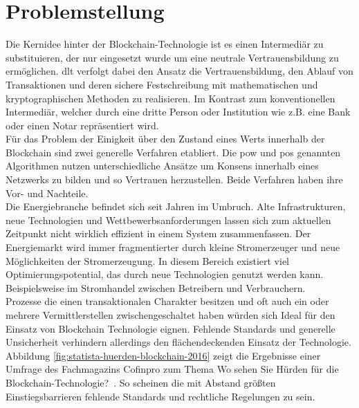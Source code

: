 \section{Problemstellung}

Die Kernidee hinter der Blockchain-Technologie ist es einen Intermediär zu substituieren, der nur eingesetzt wurde um eine neutrale Vertrauensbildung zu ermöglichen. \ac{dlt} verfolgt dabei den Ansatz die Vertrauensbildung, den Ablauf von Transaktionen und deren sichere Festschreibung mit mathematischen und kryptographischen Methoden zu realisieren. Im Kontrast zum konventionellen Intermediär, welcher durch eine dritte Person oder Institution wie z.B. eine Bank oder einen Notar repräsentiert wird.\\

Für das Problem der Einigkeit über den Zustand eines Werts innerhalb der Blockchain sind zwei generelle Verfahren etabliert. Die \ac{pow} und \ac{pos} genannten Algorithmen nutzen unterschiedliche Ansätze um Konsens innerhalb eines Netzwerks zu bilden und so Vertrauen herzustellen. Beide Verfahren haben ihre Vor- und Nachteile.\\

Die Energiebranche befindet sich seit Jahren im Umbruch. Alte Infrastrukturen, neue Technologien und Wettbewerbsanforderungen lassen sich zum aktuellen Zeitpunkt nicht wirklich effizient in einem System zusammenfassen. Der Energiemarkt wird immer fragmentierter durch kleine Stromerzeuger und neue Möglichkeiten der Stromerzeugung. In diesem Bereich existiert viel Optimierungspotential, das durch neue Technologien genutzt werden kann. Beispielsweise im Stromhandel zwischen Betreibern und Verbrauchern.\\

Prozesse die einen transaktionalen Charakter besitzen und oft auch ein oder mehrere Vermittlerstellen zwischengeschaltet haben würden sich Ideal für den Einsatz von Blockchain Technologie eignen. Fehlende Standards und generelle Unsicherheit verhindern allerdings den flächendeckenden Einsatz der Technologie.\\

Abbildung \ref{fig:statista-huerden-blockchain-2016} zeigt die Ergebnisse einer Umfrage des Fachmagazins Cofinpro zum Thema \glqq Wo sehen Sie Hürden für die Blockchain-Technologie?\grqq~. So scheinen die mit Abstand größten Einstiegsbarrieren fehlende Standards und rechtliche Regelungen zu sein.

